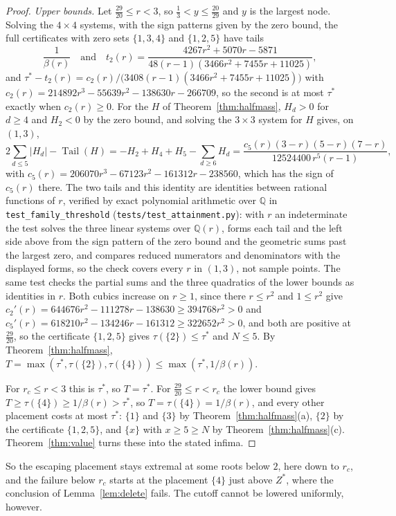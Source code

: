\documentclass[11pt]{article}
\theoremstyle{definition}
\theoremstyle{plain}
\DeclareMathOperator{\Tail}{Tail}
\begin{document}
\begin{proof}
\emph{Upper bounds.}  Let $\tfrac{29}{20}\le r<3$, so
$\tfrac13<y\le\tfrac{20}{29}$ and $y$ is the largest node.  Solving the
$4\times4$ systems, with the sign patterns given by the zero bound, the full
certificates with zero sets $\{1,3,4\}$ and $\{1,2,5\}$ have tails
\[
  \frac1{\beta(r)}\quad\text{and}\quad
  t_2(r)=\frac{4267r^2+5070r-5871}{48(r-1)(3466r^2+7455r+11025)},
\]
and $\tau^*-t_2(r)=c_2(r)/\bigl(3408(r-1)(3466r^2+7455r+11025)\bigr)$ with
$c_2(r)=214892r^3-55639r^2-138630r-266709$, so the second is at most
$\tau^*$ exactly when $c_2(r)\ge0$.  For the $H$ of
Theorem~\ref{thm:halfmass}, $H_d>0$ for $d\ge4$ and $H_2<0$ by the zero
bound, and solving the $3\times3$ system for $H$ gives, on $(1,3)$,
\[
  2\sum_{d\le5}|H_d|-\Tail(H)=-H_2+H_4+H_5-\sum_{d\ge6}H_d
  =\frac{c_5(r)(3-r)(5-r)(7-r)}{12524400\,r^5(r-1)},
\]
with $c_5(r)=206070r^3-67123r^2-161312r-238560$, which has the sign of
$c_5(r)$ there.  The two tails and this identity are identities between
rational functions of $r$, verified by exact polynomial arithmetic over
$\mathbb Q$ in \texttt{test\_family\_threshold}
(\texttt{tests/test\_attainment.py}): with $r$ an indeterminate the test
solves the three linear systems over $\mathbb Q(r)$, forms each tail and
the left side above from the sign pattern of the zero bound and the
geometric sums past the largest zero, and compares reduced numerators and
denominators with the displayed forms, so the check covers every $r$ in
$(1,3)$, not sample points.  The same test checks the partial sums and the
three quadratics of the lower bounds as identities in $r$.  Both cubics
increase on $r\ge1$, since there $r\le r^2$ and $1\le r^2$ give
$c_2'(r)=644676r^2-111278r-138630\ge394768r^2>0$ and
$c_5'(r)=618210r^2-134246r-161312\ge322652r^2>0$, and both are positive
at $\tfrac{29}{20}$, so the certificate $\{1,2,5\}$ gives
$\tau(\{2\})\le\tau^*$ and $N\le5$.  By Theorem~\ref{thm:halfmass},
$T=\max(\tau^*,\tau(\{2\}),\tau(\{4\}))\le\max(\tau^*,1/\beta(r))$.

For $r_c\le r<3$ this is $\tau^*$, so $T=\tau^*$.  For
$\tfrac{29}{20}\le r<r_c$ the lower bound gives $T\ge\tau(\{4\})\ge1/\beta(r)>\tau^*$,
so $T=\tau(\{4\})=1/\beta(r)$, and every other placement costs at most
$\tau^*$: $\{1\}$ and $\{3\}$ by Theorem~\ref{thm:halfmass}(a), $\{2\}$ by
the certificate $\{1,2,5\}$, and $\{x\}$ with $x\ge5\ge N$ by
Theorem~\ref{thm:halfmass}(c).  Theorem~\ref{thm:value} turns these into the stated infima.
\end{proof}

So the escaping placement stays extremal at some roots below $2$, here down
to $r_c$, and the failure below $r_c$ starts at the placement $\{4\}$ just
above $Z^*$, where the conclusion of Lemma~\ref{lem:delete} fails.  The cutoff cannot be
lowered uniformly, however.
\end{document}
